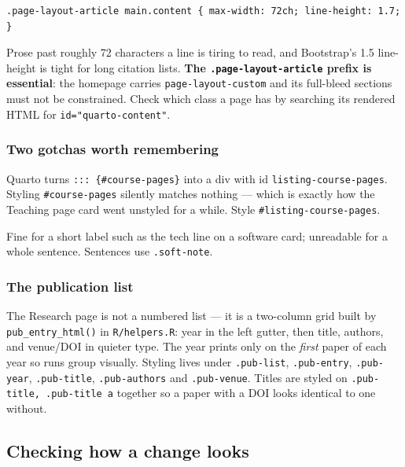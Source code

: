 \documentclass[11pt,a4paper]{article}
\newcommand{\file}[1]{\texttt{#1}}
\begin{document}
\begin{lstlisting}
.page-layout-article main.content { max-width: 72ch; line-height: 1.7; }
\end{lstlisting}

Prose past roughly 72 characters a line is tiring to read, and Bootstrap's
1.5 line-height is tight for long citation lists. \textbf{The
\texttt{.page-layout-article} prefix is essential}: the homepage carries
\texttt{page-layout-custom} and its full-bleed sections must not be
constrained. Check which class a page has by searching its rendered HTML
for \texttt{id="quarto-content"}.

\subsubsection*{Two gotchas worth remembering}

\begin{description}[style=nextline,itemsep=3pt]
\item[Listing ids are renamed]
  Quarto turns \texttt{::: \{\#course-pages\}} into a div with id
  \texttt{listing-course-pages}. Styling \texttt{\#course-pages} silently
  matches nothing --- which is exactly how the Teaching page card went
  unstyled for a while. Style \texttt{\#listing-course-pages}.
\item[\texttt{.paper-meta} is uppercase]
  Fine for a short label such as the tech line on a software card;
  unreadable for a whole sentence. Sentences use \texttt{.soft-note}.
\end{description}

\subsubsection*{The publication list}

The Research page is not a numbered list --- it is a two-column grid built
by \texttt{pub\_entry\_html()} in \file{R/helpers.R}: year in the left
gutter, then title, authors, and venue/DOI in quieter type. The year prints
only on the \emph{first} paper of each year so runs group visually. Styling
lives under \texttt{.pub-list}, \texttt{.pub-entry}, \texttt{.pub-year},
\texttt{.pub-title}, \texttt{.pub-authors} and \texttt{.pub-venue}. Titles
are styled on \texttt{.pub-title, .pub-title a} together so a paper with a
DOI looks identical to one without.

\subsection{Checking how a change looks}\label{sec:screenshot}
\end{document}
